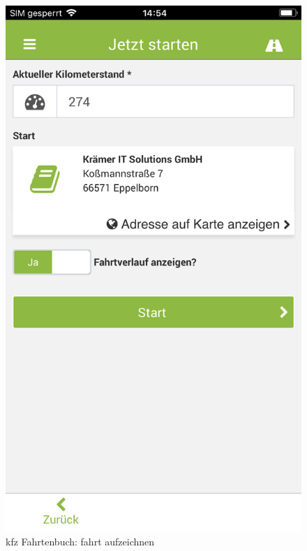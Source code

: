 \documentclass[a4paper]{article}
\begin{document}
\begin{figure}[H]
\begin{minipage}[b]{.4\linewidth}
        \includegraphics[scale=0.17]{img/kfz2}
        \caption{\label{img:img/kfz2}kfz Fahrtenbuch: fahrt aufzeichnen}
    \end{minipage}
\end{figure}
\end{document}
